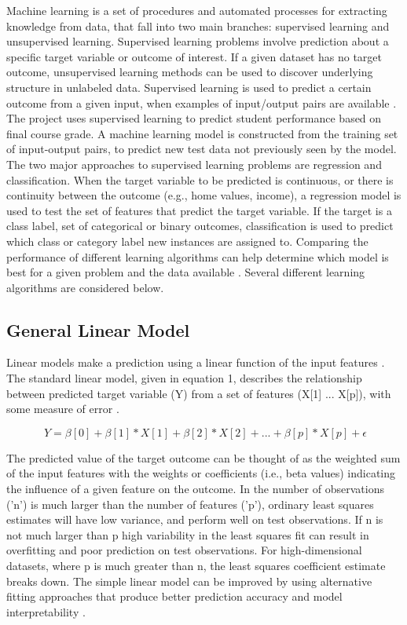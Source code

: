 \documentclass[sigconf]{acmart}
\begin{document}
Machine learning is a set of procedures and automated processes for extracting 
knowledge from data, that fall into two main branches: supervised learning and 
unsupervised learning. Supervised learning problems involve prediction about a 
specific target variable or outcome of interest. If a given dataset has no 
target outcome, unsupervised learning methods can be used to discover underlying 
structure in unlabeled data. Supervised learning is used to predict a certain 
outcome from a given input, when examples of input/output pairs are available 
\cite{muller17}. The project uses supervised learning to predict student 
performance based on final course grade. A machine learning model is constructed from the 
training set of input-output pairs, to predict new test data not previously 
seen by the model. The two major approaches to supervised learning problems are 
regression and classification. When the target variable to be predicted is 
continuous, or there is continuity between the outcome (e.g., home values, 
income), a regression model is used to test the set of features that predict 
the target variable. If the target is a class label, set of categorical or 
binary outcomes, classification is used to predict which class or category label 
new instances are assigned to. Comparing the performance of different learning 
algorithms can help determine which model is best for a given problem and 
the data available \cite{raschka17}. Several different 
learning algorithms are considered below.

\subsection{General Linear Model} 

Linear models make a prediction using a linear function of the input features
\cite{muller17}. The standard linear model, given in equation 1, describes the
relationship between predicted target variable (Y) from a set of features 
(X[1] ... X[p]), with some measure of error . 

\begin{equation}
  \ Y = \beta[0] + \beta[1]*X[1] + \beta[2]*X[2] +... + \beta[p]*X[p] + \epsilon
\end{equation}

The predicted value of the target outcome can be thought of as the weighted 
sum of the input features with the weights or coefficients (i.e., beta values) 
indicating the influence of a given feature on the outcome. In the number of
observations ('n') is much larger than the number of features ('p'), ordinary 
least squares estimates will have low variance, and perform well on test
observations. If n is not much larger than p high variability in the least
squares fit can result in overfitting and poor prediction on test observations.
For high-dimensional datasets, where p is much greater than n, the least
squares coefficient estimate breaks down. The simple linear model can be
improved by using alternative fitting approaches that produce better 
prediction accuracy and model interpretability \cite{statlearn13}. 
\end{document}
